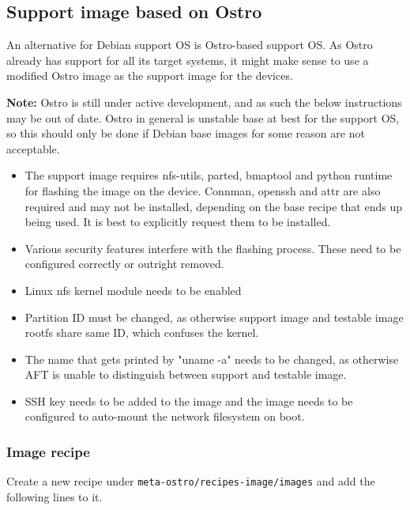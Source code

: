 \documentclass[a4paper,11pt]{article}
\newcommand{\note}{\textbf{Note: }}
\newcommand{\cmd}[1]{\texttt{#1}}
\begin{document}
\subsection*{Support image based on Ostro\texttrademark}

An alternative for Debian support OS is Ostro-based support OS. As Ostro already has support for all its target systems, it might make sense to use a modified Ostro image as the support image for the devices. 

\note Ostro is still under active development, and as such the below instructions may be out of date. Ostro in general is unstable base at best for the support OS, so this should only be done if Debian base images for some reason are not acceptable.

\begin{itemize}

\item The support image requires nfs-utils, parted, bmaptool and python runtime for flashing the image on the device. Connman, openssh and attr are also required and may not be installed, depending on the base recipe that ends up being used. It is best to explicitly request them to be installed.

\item Various security features interfere with the flashing process. These need to be configured correctly or outright removed.

\item Linux nfs kernel module needs to be enabled

\item Partition ID must be changed, as otherwise support image and testable image rootfs share same ID, which confuses the kernel.

\item The name that gets printed by "uname -a" needs to be changed, as otherwise AFT is unable to distinguish between support and testable image.

\item SSH key needs to be added to the image and the image needs to be configured to auto-mount the network filesystem on boot.

\end{itemize}

\subsubsection*{Image recipe}

Create a new recipe under \cmd{meta-ostro/recipes-image/images} and add the following lines to it.
\end{document}
